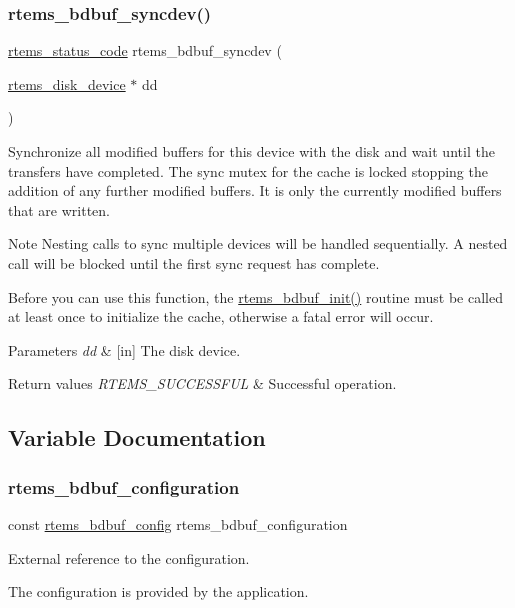 \subsubsection{\texorpdfstring{rtems\_bdbuf\_syncdev()}{rtems\_bdbuf\_syncdev()}}
{\footnotesize\ttfamily \mbox{\hyperlink{group__ClassicStatus_ga545d41846817eaba6143d52ee4d9e9fe}{rtems\+\_\+status\+\_\+code}} rtems\+\_\+bdbuf\+\_\+syncdev (\begin{DoxyParamCaption}\item[{\mbox{\hyperlink{structrtems__disk__device}{rtems\+\_\+disk\+\_\+device}} $\ast$}]{dd }\end{DoxyParamCaption})}

Synchronize all modified buffers for this device with the disk and wait until the transfers have completed. The sync mutex for the cache is locked stopping the addition of any further modified buffers. It is only the currently modified buffers that are written.

\begin{DoxyNote}{Note}
Nesting calls to sync multiple devices will be handled sequentially. A nested call will be blocked until the first sync request has complete.
\end{DoxyNote}
Before you can use this function, the \mbox{\hyperlink{group__rtems__bdbuf_gaf19ee8ba7815e24767b6a91e200a78bc}{rtems\+\_\+bdbuf\+\_\+init()}} routine must be called at least once to initialize the cache, otherwise a fatal error will occur.


\begin{DoxyParams}{Parameters}
{\em dd} & \mbox{[}in\mbox{]} The disk device.\\
\hline
\end{DoxyParams}

\begin{DoxyRetVals}{Return values}
{\em R\+T\+E\+M\+S\+\_\+\+S\+U\+C\+C\+E\+S\+S\+F\+UL} & Successful operation. \\
\hline
\end{DoxyRetVals}


\subsection{Variable Documentation}
\mbox{\label{group__rtems__bdbuf_gac1ab295c43675e17b20a7af3956c2a72}} 
\subsubsection{\texorpdfstring{rtems\_bdbuf\_configuration}{rtems\_bdbuf\_configuration}}
{\footnotesize\ttfamily const \mbox{\hyperlink{structrtems__bdbuf__config}{rtems\+\_\+bdbuf\+\_\+config}} rtems\+\_\+bdbuf\+\_\+configuration}

External reference to the configuration.

The configuration is provided by the application. 